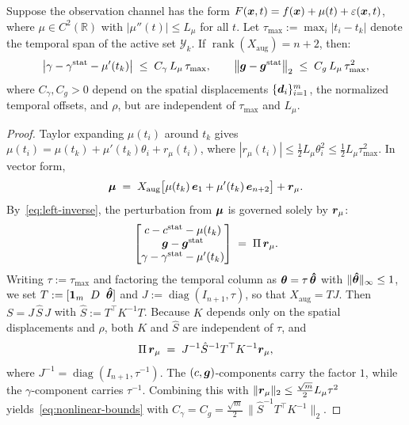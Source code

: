 \begin{theorem}
\label{thm:nonlinear-drift}
Suppose the observation channel has the form $F(\boldsymbol{x},t) = f(\boldsymbol{x}) + \mu(t) + \varepsilon(\boldsymbol{x},t)$, where $\mu \in C^2(\mathbb{R})$ with $|\mu''(t)| \le L_\mu$ for all $t$. Let $\tau_{\max} := \max_{i} |t_i - t_k|$ denote the temporal span of the active set $\mathcal{Y}_k$. If $\operatorname{rank}(X_{\mathrm{aug}}) = n+2$, then:
\begin{equation}\label{eq:nonlinear-bounds}
  \bigl|\gamma - \gamma^{\mathrm{stat}} - \mu'(t_k)\bigr| \;\le\; C_\gamma\,L_\mu\,\tau_{\max},
  \qquad
  \bigl\|\boldsymbol{g} - \boldsymbol{g}^{\mathrm{stat}}\bigr\|_2 \;\le\; C_g\,L_\mu\,\tau_{\max}^2,
\end{equation}
where $C_\gamma, C_g > 0$ depend on the spatial displacements $\{\boldsymbol{d}_i\}_{i=1}^m$, the normalized temporal offsets, and $\rho$, but are independent of $\tau_{\max}$ and $L_\mu$.
\end{theorem}

\begin{proof}
Taylor expanding $\mu(t_i)$ around $t_k$ gives $\mu(t_i) = \mu(t_k) + \mu'(t_k)\theta_i + r_\mu(t_i)$, where $|r_\mu(t_i)| \le \tfrac{1}{2} L_\mu \theta_i^2 \le \tfrac{1}{2} L_\mu \tau_{\max}^2$. In vector form,
\[
  \boldsymbol{\mu} \;=\; X_{\mathrm{aug}}\bigl[\mu(t_k)\, \boldsymbol{e}_1 + \mu'(t_k)\, \boldsymbol{e}_{n+2}\bigr] + \boldsymbol{r}_\mu.
\]
By~\eqref{eq:left-inverse}, the perturbation from $\boldsymbol{\mu}$ is governed solely by $\boldsymbol{r}_\mu$:
\[
  \begin{bmatrix}c - c^{\mathrm{stat}} - \mu(t_k)\\\boldsymbol{g} - \boldsymbol{g}^{\mathrm{stat}}\\\gamma - \gamma^{\mathrm{stat}} - \mu'(t_k)\end{bmatrix}
  \;=\; \Pi\,\boldsymbol{r}_\mu.
\]
Writing $\tau := \tau_{\max}$ and factoring the temporal column as $\boldsymbol{\theta} = \tau\,\boldsymbol{\hat\theta}$ with $\|\boldsymbol{\hat\theta}\|_\infty \le 1$, we set $T := [\mathbf{1}_m \;\; D \;\; \boldsymbol{\hat\theta}]$ and $J := \operatorname{diag}(I_{n+1}, \tau)$, so that $X_{\mathrm{aug}} = TJ$. Then $S = J\,\hat S\,J$ with $\hat S := T^\top K^{-1} T$. Because $K$ depends only on the spatial displacements and $\rho$, both $K$ and $\hat S$ are independent of $\tau$, and
\[
  \Pi\, \boldsymbol{r}_\mu \;=\; J^{-1} \hat S^{-1} T^\top K^{-1} \boldsymbol{r}_\mu,
\]
where $J^{-1} = \operatorname{diag}(I_{n+1}, \tau^{-1})$. The $(c,\boldsymbol{g})$-components carry the factor $1$, while the $\gamma$-component carries $\tau^{-1}$. Combining this with $\|\boldsymbol{r}_\mu\|_2 \le \tfrac{\sqrt{m}}{2} L_\mu \tau^2$ yields~\eqref{eq:nonlinear-bounds} with $C_\gamma = C_g = \tfrac{\sqrt{m}}{2}\,\|\hat S^{-1} T^\top K^{-1}\|_2$.
\end{proof}


